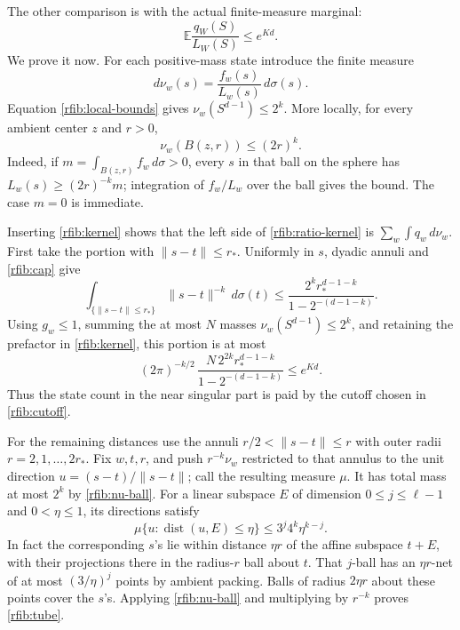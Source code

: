 The other comparison is with the actual finite-measure marginal:
\begin{equation}\label{rfib:ratio-kernel}
 \mathbb E\frac{q_W(S)}{L_W(S)}\le e^{Kd}.
\end{equation}
We prove it now.  For each positive-mass state introduce the finite
measure
\[
 d\nu_w(s)=\frac{f_w(s)}{L_w(s)}\,d\sigma(s).
\]
Equation \eqref{rfib:local-bounds} gives
\(\nu_w(S^{d-1})\le2^k\).  More locally, for every ambient center
\(z\) and \(r>0\),
\begin{equation}\label{rfib:nu-ball}
 \nu_w(B(z,r))\le(2r)^k .
\end{equation}
Indeed, if \(m=\int_{B(z,r)}f_w\,d\sigma>0\), every \(s\) in that
ball on the sphere has \(L_w(s)\ge(2r)^{-k}m\); integration of
\(f_w/L_w\) over the ball gives the bound.  The case \(m=0\) is
immediate.

Inserting \eqref{rfib:kernel} shows that the left side of
\eqref{rfib:ratio-kernel} is \(\sum_w\int q_w\,d\nu_w\).  First take
the portion with \(\|s-t\|\le r_*\).  Uniformly in \(s\), dyadic
annuli and \eqref{rfib:cap} give
\begin{equation}\label{rfib:near}
 \int_{\{\|s-t\|\le r_*\}}\|s-t\|^{-k}\,d\sigma(t)
 \le\frac{2^k r_*^{d-1-k}}
          {1-2^{-(d-1-k)}}.
\end{equation}
Using \(g_w\le1\), summing the at most \(N\) masses
\(\nu_w(S^{d-1})\le2^k\), and retaining the prefactor in
\eqref{rfib:kernel}, this portion is at most
\[
 (2\pi)^{-k/2}\,
 \frac{N\,2^{2k} r_*^{d-1-k}}
      {1-2^{-(d-1-k)}}\le e^{Kd}.
\]
Thus the state count in the near singular part is paid by the cutoff
chosen in \eqref{rfib:cutoff}.

For the remaining distances use the annuli
\(r/2<\|s-t\|\le r\) with outer radii
\(r=2,1,\ldots,2r_*\).  Fix \(w,t,r\), and push
\(r^{-k}\nu_w\) restricted to that annulus to the unit direction
\(u=(s-t)/\|s-t\|\); call the resulting measure \(\mu\).
It has total mass at most \(2^k\) by \eqref{rfib:nu-ball}.
For a linear subspace \(E\) of dimension \(0\le j\le\ell-1\) and
\(0<\eta\le1\), its directions satisfy
\begin{equation}\label{rfib:tube}
 \mu\{u:\operatorname{dist}(u,E)\le\eta\}
 \le3^j4^k\eta^{k-j}.
\end{equation}
In fact the corresponding \(s\)'s lie within distance \(\eta r\) of
the affine subspace \(t+E\), with their projections there in the
radius-\(r\) ball about \(t\).  That \(j\)-ball has an
\(\eta r\)-net of at most \((3/\eta)^j\) points by ambient packing.
Balls of radius \(2\eta r\) about these points cover the \(s\)'s.
Applying \eqref{rfib:nu-ball} and multiplying by \(r^{-k}\) proves
\eqref{rfib:tube}.

